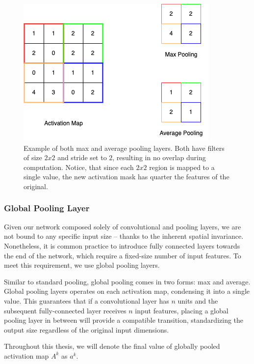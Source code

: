 \begin{figure}
    \begin{center}
    \begin{minipage}{0.5\textwidth}
      \includegraphics[width=\textwidth]{img/cnn-pool.png}
    \end{minipage}
    \caption{Example of both max and average pooling layers. Both have filters of size $2x2$ and stride set to $2$, resulting in no overlap during computation. Notice, that since each $2x2$ region is mapped to a single value, the new activation mask has quarter the features of the original.}
    \label{fig:cnn-pooling}
    \end{center}
\end{figure}

\subsubsection{Global Pooling Layer}

Given our network composed solely of convolutional and pooling layers, we are not bound to any specific input size -- thanks to the inherent spatial invariance.
Nonetheless, it is common practice to introduce fully connected layers towards the end of the network, which require a fixed-size number of input features.
To meet this requirement, we use global pooling layers.

Similar to standard pooling, global pooling comes in two forms: max and average.
Global pooling layers operates on each activation map, condensing it into a single value.
This guarantees that if a convolutional layer has $n$ units and the subsequent fully-connected layer receives $n$ input features, placing a global pooling layer in between will provide a compatible transition, standardizing the output size regardless of the original input dimensions.

Throughout this thesis, we will denote the final value of globally pooled activation map $A^k$ as $a^k$.
